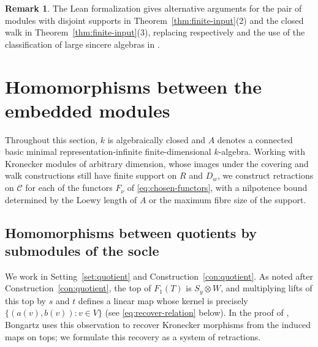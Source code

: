 \documentclass[a4paper,reqno,10pt]{amsart}
\theoremstyle{definition}
\newtheorem{remark}[theorem]{Remark}
\newcommand{\C}{\mathcal C}
\numberwithin{equation}{section}
\begin{document}
\begin{remark}\label{rem:formalization-arguments}
The Lean formalization gives alternative arguments for the pair of modules
with disjoint supports in Theorem~\ref{thm:finite-input}(2) and the closed walk in
Theorem~\ref{thm:finite-input}(3), replacing respectively
\cite[Lemma~5]{Bongartz} and the use of the classification of large sincere
algebras in \cite[proof of Theorem~7]{Bongartz}.
\end{remark}

\section{Homomorphisms between the embedded modules}
\label{sec:control}
Throughout this section, $k$ is algebraically closed and $A$ denotes a
connected basic minimal representation-infinite finite-dimensional
$k$-algebra. Working with Kronecker modules of arbitrary dimension, whose
images under the covering and walk constructions still have finite support
on $R$ and $D_w$, we construct retractions on $\C$ for each of the functors
$F_\nu$ of \eqref{eq:chosen-functors}, with a nilpotence bound determined by
the Loewy length of $A$ or the maximum fibre size of the support.

\subsection{Homomorphisms between quotients by submodules of the socle}
We work in Setting~\ref{set:quotient} and Construction~\ref{con:quotient}.
As noted after Construction~\ref{con:quotient}, the top of
$F_1(T)$ is $S_y\otimes W$, and multiplying lifts of
this top by $s$ and $t$ defines a linear map whose kernel is precisely
$\{(a(v),b(v)):v\in V\}$ (see \eqref{eq:recover-relation} below).
In the proof of \cite[Theorem~1]{Bongartz}, Bongartz uses this observation to recover Kronecker
morphisms from the induced maps on tops; we formulate this recovery as a system of
retractions.
\end{document}

